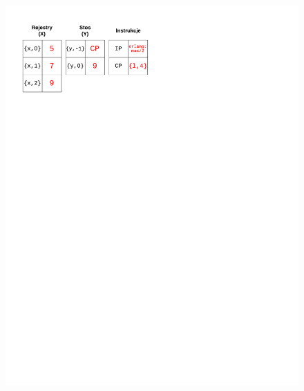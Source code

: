 \begin{figure}
\begin{multicols}{2}
\vspace{-4mm}
\begin{Figure}
 \centering
 \includegraphics[scale=0.65, clip, trim=10mm 215mm 110mm 10mm]{interpreter_max_4}
\label{fig:max4}
\end{Figure}


\end{multicols}
\end{figure}
